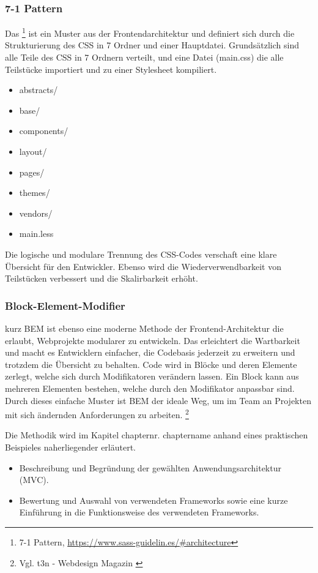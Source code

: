 \subsubsection{7-1 Pattern}
\label{sec:7-1}
Das 
\footnote{7-1 Pattern, \url{https://www.sass-guidelin.es/#architecture}} ist ein
Muster aus der Frontendarchitektur und definiert sich durch die Strukturierung des \ac{CSS} in 7 Ordner und einer Hauptdatei.
Grundsätzlich sind alle Teile des \ac{CSS} in 7 Ordnern verteilt, und eine Datei
(main.css) die alle Teilstücke importiert und zu einer Stylesheet kompiliert.
\begin{multicols}{4}
\begin{itemize}
\item abstracts/
\item base/
\item components/
\item layout/
\item pages/
\item themes/
\item vendors/
\item main.less
\end{itemize}
\end{multicols}
Die logische und modulare Trennung des \ac{CSS}-Codes verschaft eine klare
Übersicht für den Entwickler. Ebenso wird die Wiederverwendbarkeit von
Teilstücken verbessert und die Skalirbarkeit erhöht.


\subsubsection{Block-Element-Modifier}
\label{sec:BEM}
 kurz \acs{BEM} ist ebenso eine moderne
Methode der Frontend-Architektur die erlaubt, Webprojekte modularer zu entwickeln.
Das erleichtert die Wartbarkeit und macht es Entwicklern einfacher, die
Codebasis jederzeit zu erweitern und trotzdem die Übersicht zu behalten.
Code wird in Blöcke und deren Elemente zerlegt, welche sich durch Modifikatoren
verändern lassen. Ein Block kann aus mehreren Elementen bestehen, welche durch
den Modifikator anpassbar sind. Durch dieses einfache Muster ist BEM der ideale
Weg, um im Team an Projekten mit sich ändernden Anforderungen zu arbeiten.
 \footnote{Vgl. t3n - Webdesign Magazin \cite{BEM}}
 
Die Methodik wird im Kapitel \xx chapternr. chaptername anhand eines
praktischen Beispieles naherliegender erläutert.


\begin{itemize}
	\item Beschreibung und Begründung der gewählten Anwendungsarchitektur (\zB \acs{MVC}).
	\item \Ggfs Bewertung und Auswahl von verwendeten Frameworks sowie \ggfs eine kurze Einführung in die Funktionsweise des verwendeten Frameworks.
\end{itemize}


